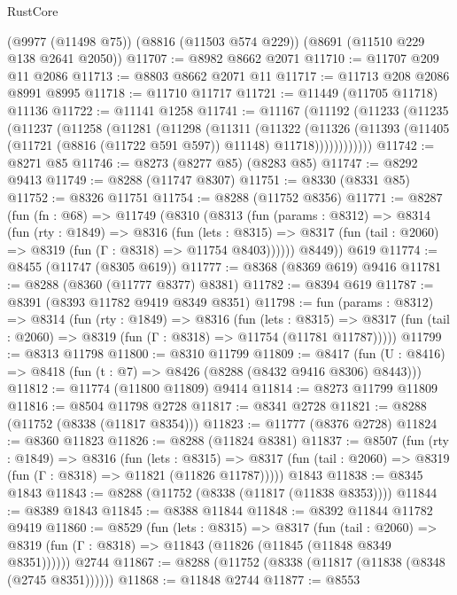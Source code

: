 \begin{lexlean}{RustCore}
\begin{coremodule}
    (@9977 (@11498 @75))
    (@8816 (@11503 @574 @229))
    (@8691 (@11510 @229 @138 @2641 @2050))
@11707 := @8982 @8662 @2071
@11710 := @11707 @209 @11 @2086
@11713 := @8803 @8662 @2071 @11
@11717 := @11713 @208 @2086 @8991 @8995
@11718 := @11710 @11717
@11721 := @11449 (@11705 @11718) @11136
@11722 := @11141 @1258
@11741 := @11167
    (@11192
      (@11233
        (@11235
          (@11237
            (@11258
              (@11281
                (@11298
                  (@11311
                    (@11322
                      (@11326
                        (@11393
                          (@11405 (@11721 (@8816 (@11722 @591 @597)) @11148) @11718))))))))))))
@11742 := @8271 @85
@11746 := @8273 (@8277 @85) (@8283 @85)
@11747 := @8292 @9413
@11749 := @8288 (@11747 @8307)
@11751 := @8330 (@8331 @85)
@11752 := @8326 @11751
@11754 := @8288 (@11752 @8356)
@11771 := @8287
    (fun (fn : @68) =>
    @11749
      (@8310
        (@8313
          (fun (params : @8312) =>
          @8314
            (fun (rty : @1849) =>
            @8316
              (fun (lets : @8315) =>
              @8317 (fun (tail : @2060) => @8319 (fun (Γ : @8318) => @11754 @8403))))))
        @8449))
    @619
@11774 := @8455 (@11747 (@8305 @619))
@11777 := @8368 (@8369 @619) @9416
@11781 := @8288 (@8360 (@11777 @8377) @8381)
@11782 := @8394 @619
@11787 := @8391 (@8393 @11782 @9419 @8349 @8351)
@11798 := fun (params : @8312) =>
  @8314
    (fun (rty : @1849) =>
    @8316
      (fun (lets : @8315) =>
      @8317 (fun (tail : @2060) => @8319 (fun (Γ : @8318) => @11754 (@11781 @11787)))))
@11799 := @8313 @11798
@11800 := @8310 @11799
@11809 := @8417 (fun (U : @8416) => @8418 (fun (t : @7) => @8426 (@8288 (@8432 @9416 @8306) @8443)))
@11812 := @11774 (@11800 @11809) @9414
@11814 := @8273 @11799 @11809
@11816 := @8504 @11798 @2728
@11817 := @8341 @2728
@11821 := @8288 (@11752 (@8338 (@11817 @8354)))
@11823 := @11777 (@8376 @2728)
@11824 := @8360 @11823
@11826 := @8288 (@11824 @8381)
@11837 := @8507
    (fun (rty : @1849) =>
    @8316
      (fun (lets : @8315) =>
      @8317 (fun (tail : @2060) => @8319 (fun (Γ : @8318) => @11821 (@11826 @11787)))))
    @1843
@11838 := @8345 @1843
@11843 := @8288 (@11752 (@8338 (@11817 (@11838 @8353))))
@11844 := @8389 @1843
@11845 := @8388 @11844
@11848 := @8392 @11844 @11782 @9419
@11860 := @8529
    (fun (lets : @8315) =>
    @8317
      (fun (tail : @2060) =>
      @8319 (fun (Γ : @8318) => @11843 (@11826 (@11845 (@11848 @8349 @8351))))))
    @2744
@11867 := @8288 (@11752 (@8338 (@11817 (@11838 (@8348 (@2745 @8351))))))
@11868 := @11848 @2744
@11877 := @8553

\end{coremodule}
\end{lexlean}
